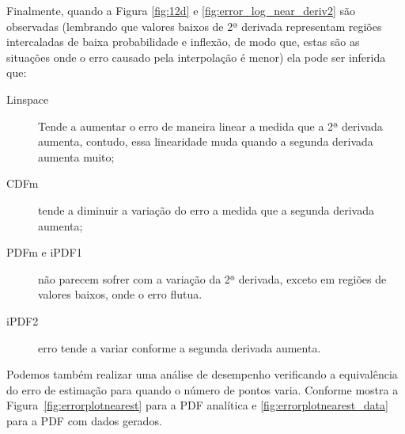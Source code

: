 
Finalmente, quando a Figura \ref{fig:12d} e \ref{fig:error_log_near_deriv2} são observadas (lembrando que valores baixos de 2ª derivada representam regiões intercaladas de baixa probabilidade e inflexão, de modo que, estas são as situações onde o erro causado pela interpolação é menor) ela pode ser inferida que:

\begin{description}
	\item[Linspace] Tende a aumentar o erro de maneira linear a medida que a 2ª derivada aumenta, contudo, essa linearidade muda quando a segunda derivada aumenta muito;%
	\item[CDFm] tende a diminuir a variação do erro a medida que a segunda derivada aumenta;
	\item[PDFm e iPDF1] não parecem sofrer com a variação da 2ª derivada, exceto em regiões de valores baixos, onde o erro flutua.
	\item[iPDF2] erro tende a variar conforme a segunda derivada aumenta.
\end{description}

Podemos também realizar uma análise de desempenho verificando a equivalência do erro de estimação para quando o número de pontos varia. Conforme mostra a Figura~\ref{fig:errorplotnearest} para a PDF analítica e \ref{fig:errorplotnearest_data} para a PDF com dados gerados.

